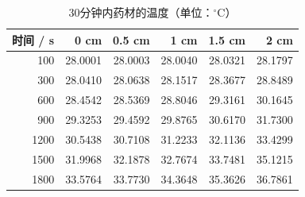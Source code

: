 \begin{table}[htbp]
\caption{30分钟内药材的温度（单位：$^\circ$C）}\label{tab:required-1}
\centering
\small
\begin{tabular}{rrrrrr}
\toprule
时间 / s & 0 cm & 0.5 cm & 1 cm & 1.5 cm & 2 cm \\
\midrule
100 & 28.0001 & 28.0003 & 28.0040 & 28.0321 & 28.1797 \\
300 & 28.0410 & 28.0638 & 28.1517 & 28.3677 & 28.8489 \\
600 & 28.4542 & 28.5369 & 28.8046 & 29.3161 & 30.1645 \\
900 & 29.3253 & 29.4592 & 29.8765 & 30.6170 & 31.7300 \\
1200 & 30.5438 & 30.7108 & 31.2233 & 32.1136 & 33.4299 \\
1500 & 31.9968 & 32.1878 & 32.7674 & 33.7481 & 35.1215 \\
1800 & 33.5764 & 33.7730 & 34.3648 & 35.3626 & 36.7861 \\
\bottomrule
\end{tabular}
\end{table}
